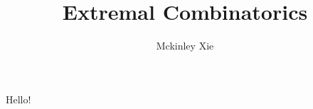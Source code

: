 \documentclass{scrartcl}
\title{Extremal Combinatorics}
\author{Mckinley Xie}
\begin{document}
Hello!  \cite{amspc3_extremal}
\printbibliography
\end{document}
